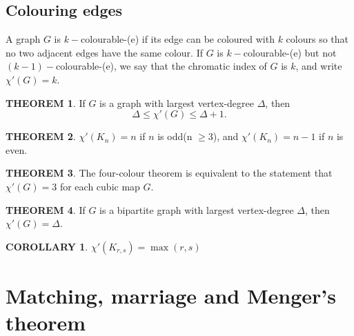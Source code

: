 \documentclass[a4paper,11pt]{article}%
\theoremstyle{remark}
\theoremstyle{definition}
\newtheorem{theorem}{THEOREM}[section]
\theoremstyle{definition}
\newtheorem{corollary}{COROLLARY}[section]
\theoremstyle{definition}
\theoremstyle{definition}
\theoremstyle{plain}
\theoremstyle{definition}
\begin{document}
\subsection{Colouring edges}
A graph $G$ is $k-$colourable-(e) if its edge can be coloured with $k$ colours so that no two adjacent edges have the same colour.
If $G$ is $k-$colourable-(e) but not $(k-1)-$colourable-(e), we say that the chromatic index of $G$ is $k$, and write $\chi'(G)=k$.
\begin{theorem}
If $G$ is a graph with largest vertex-degree $\Delta$, then 
\[\Delta\leq\chi'(G)\leq\Delta+1.\]    
\end{theorem}
\begin{theorem}
    $\chi'(K_n)=n$ if $n$ is odd(n $\geq 3$), and $\chi'(K_n)=n-1$ if $n$ is even.
\end{theorem}
\begin{theorem}
    The four-colour theorem is equivalent to the statement that $\chi'(G)=3$ for each cubic map $G$.
\end{theorem}
\begin{theorem}
    If $G$ is a bipartite graph with largest vertex-degree $\Delta$, then $\chi'(G)=\Delta$.
\end{theorem}
\begin{corollary}
    $\chi'(K_{r,s})=\max(r,s)$
\end{corollary}
\section{Matching, marriage and Menger's theorem}
\end{document}
